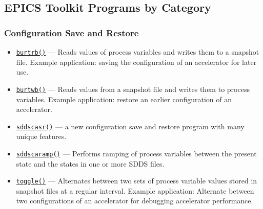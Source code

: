 \documentclass[11pt]{article}
\newcommand{\progref}[1]{\hyperref[#1]{\texttt{#1()}}}
\begin{document}
\subsection{EPICS Toolkit Programs by Category}
\subsubsection{Configuration Save and Restore}
\begin{itemize}
\item \progref{burtrb} --- Reads values of process variables and writes them to a snapshot file.
        Example application: saving the configuration of an accelerator for later use.
\item \progref{burtwb} --- Reads values from a snapshot file and writes them to process variables.
        Example application: restore an earlier configuration of an accelerator.
\item \progref{sddscasr} --- a new configuration save and restore program with many unique features.
\item \progref{sddscaramp} --- Performs ramping of process variables between
the present state and the states in one or more SDDS files.
\item \progref{toggle} --- Alternates between two sets of process variable values stored in snapshot files
        at a regular interval.
        Example application: Alternate between two configurations of an accelerator for debugging
        accelerator performance.
\end{itemize}
\end{document}
